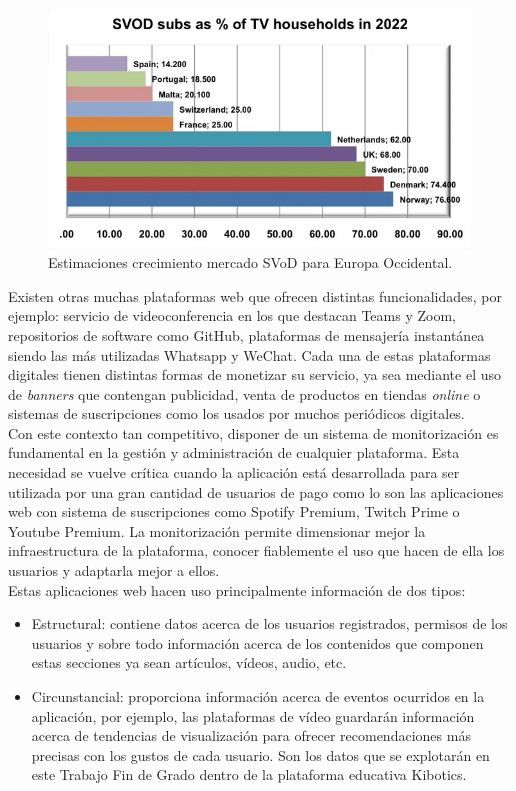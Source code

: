 \documentclass[a4paper, 12pt]{book}
\begin{document}
		\begin{figure}[H]
			\centering
			\includegraphics[width=12cm, keepaspectratio]{img/SVoD.png}
			\caption{Estimaciones crecimiento mercado SVoD para Europa Occidental.}
			\label{fig:svod}
		\end{figure}
		
		
		Existen otras muchas plataformas web que ofrecen distintas funcionalidades, por ejemplo: servicio de videoconferencia  en los que destacan Teams y Zoom, repositorios de software como GitHub, plataformas de mensajería instantánea siendo las más utilizadas Whatsapp y WeChat. Cada una de estas plataformas digitales tienen distintas formas de monetizar su servicio, ya sea mediante el uso de \textit{banners} que contengan publicidad, venta de productos en tiendas \textit{online} o sistemas de suscripciones como los usados por muchos periódicos digitales. \\
			
		Con este contexto tan competitivo, disponer de un sistema de monitorización es fundamental en la gestión y administración de cualquier plataforma. Esta necesidad se vuelve crítica cuando la aplicación está desarrollada para ser utilizada por una gran cantidad de usuarios de pago como lo son las aplicaciones web con sistema de suscripciones como Spotify Premium, Twitch Prime o Youtube Premium. La monitorización permite dimensionar mejor la infraestructura de la plataforma, conocer fiablemente el uso que hacen de ella los usuarios y adaptarla mejor a ellos. \\
		
		Estas aplicaciones web hacen uso principalmente información de dos tipos:
		\begin{itemize}
			\item Estructural: contiene datos acerca de los usuarios registrados, permisos de los usuarios y sobre todo información acerca de los contenidos que componen estas secciones ya sean artículos, vídeos, audio, etc.
			
			\item Circunstancial: proporciona información acerca de eventos ocurridos en la aplicación, por ejemplo, las plataformas de vídeo guardarán información acerca de tendencias de visualización para ofrecer recomendaciones más precisas con los gustos de cada usuario. Son los datos que se explotarán en este Trabajo Fin de Grado dentro de la plataforma educativa Kibotics.
		\end{itemize}
		
\end{document}
